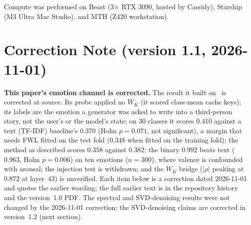 \documentclass[11pt,a4paper]{article}
\begin{document}
Compute was performed on Beast (3$\times$ RTX 3090, hosted by Cassidy),
Starship (M3 Ultra Mac Studio), and MTH (Z420 workstation).


\section*{Correction Note (version 1.1, 2026-11-01)}

\textbf{This paper's emotion channel is corrected.} The result it built
on~\citep{lyra_p4} is corrected at source. Its probe applied no $W_K$
(it scored class-mean cache keys); its labels are the emotion a generator
was asked to write into a third-person story, not the user's or the model's
state; on 30 classes it scores $0.410$ against a text (TF-IDF) baseline's
$0.370$ (Holm $p = 0.071$, not significant), a margin that needs FWL fitted
on the test fold ($0.348$ when fitted on the training fold); the method as
described scores $0.358$ against $0.382$; the binary $0.992$ beats text
($0.963$, Holm $p = 0.006$) on ten emotions ($n = 300$), where valence is
confounded with arousal; the injection test is withdrawn; and the $W_K$
bridge ($|\rho|$ peaking at $0.872$ at layer~43) is unverified. Each item
below is a correction dated 2026-11-01 and quotes the earlier wording; the
full earlier text is in the repository history and the version~1.0 PDF. The
spectral and SVD-denoising results were not changed by the 2026-11-01
correction; the SVD-denoising claims are corrected in version~1.2 (next
section).
\end{document}
